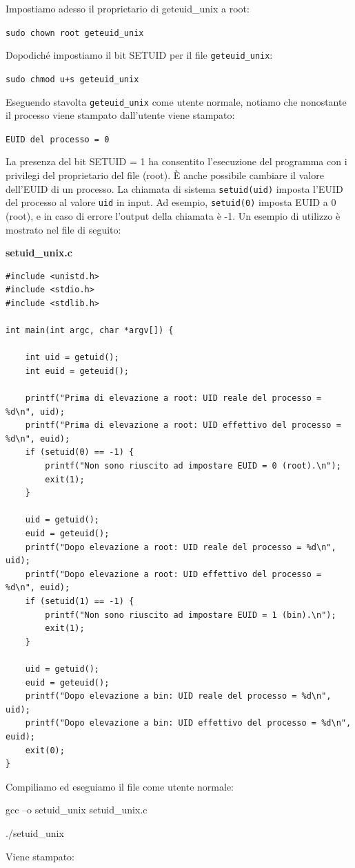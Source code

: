Impostiamo adesso il proprietario di geteuid\_unix a root:
\begin{center}
    \texttt{sudo chown root geteuid\_unix}
\end{center}
Dopodiché impostiamo il bit SETUID per il file \texttt{geteuid\_unix}:

\begin{center}
    \texttt{sudo chmod u+s geteuid\_unix}
\end{center}

Eseguendo stavolta \texttt{geteuid\_unix} come utente normale, notiamo che nonostante il processo viene stampato dall'utente viene stampato:

\texttt{EUID del processo = 0}

La presenza del bit SETUID = 1 ha consentito l'esecuzione del programma con i privilegi del proprietario del file (root). È anche possibile cambiare il valore dell'EUID di un processo. La chiamata di sistema \texttt{setuid(uid)} imposta l'EUID del processo al valore \texttt{uid} in input. Ad esempio, \texttt{setuid(0)} imposta EUID a 0 (root), e in caso di errore l'output della chiamata è -1. Un esempio di utilizzo è mostrato nel file di seguito:

\begin{mdframed}[backgroundcolor=white!20,shadow=false]
\textbf{setuid\_unix.c}

\begin{verbatim}
#include <unistd.h>
#include <stdio.h>
#include <stdlib.h>

int main(int argc, char *argv[]) {

	int uid = getuid();
	int euid = geteuid();

	printf("Prima di elevazione a root: UID reale del processo = %d\n", uid);
	printf("Prima di elevazione a root: UID effettivo del processo = %d\n", euid);
	if (setuid(0) == -1) {
		printf("Non sono riuscito ad impostare EUID = 0 (root).\n");
		exit(1);
	}

	uid = getuid();
	euid = geteuid();
	printf("Dopo elevazione a root: UID reale del processo = %d\n", uid);
	printf("Dopo elevazione a root: UID effettivo del processo = %d\n", euid);
	if (setuid(1) == -1) {
		printf("Non sono riuscito ad impostare EUID = 1 (bin).\n");
		exit(1);
	}

	uid = getuid();
	euid = geteuid();
	printf("Dopo elevazione a bin: UID reale del processo = %d\n", uid);
	printf("Dopo elevazione a bin: UID effettivo del processo = %d\n", euid);
	exit(0);
}

\end{verbatim}

\end{mdframed}
Compiliamo ed eseguiamo il file come utente normale:
\begin{center}
    gcc –o setuid\_unix setuid\_unix.c
    
    ./setuid\_unix

\end{center}
Viene stampato:

